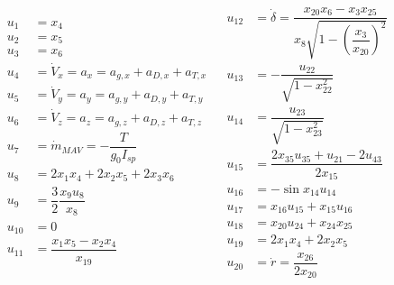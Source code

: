 \begin{align} \label{eq:unAuxEq1}
\begin{split} 
u_{1}&=x_{4}\\
u_{2}&=x_{5}\\
u_{3}&=x_{6} \\
u_{4}&=\dot{V}_{x}=a_{x}=a_{g,x}+a_{D,x}+a_{T,x}\\
u_{5}&=\dot{V}_{y}=a_{y}=a_{g,y}+a_{D,y}+a_{T,y}\\
u_{6}&=\dot{V}_{z}=a_{z}=a_{g,z}+a_{D,z}+a_{T,z}\\
u_{7} &=\dot{m}_{MAV}=-\dfrac{T}{g_{0}I_{sp}}\\
u_{8}&=2x_{1}x_{4}+2x_{2}x_{5}+2x_{3}x_{6}\\
u_{9}&=\dfrac{3}{2}\dfrac{x_{9}u_{8}}{x_{8}}\\
u_{10} &= 0 \\
u_{11} &= \dfrac{x_{1}x_{5}-x_{2}x_{4}}{x_{19}}\\
\end{split}
&
\begin{split}
u_{12} &= \dot{\delta} = \dfrac{x_{20}x_{6}-x_{3}x_{25}}{x_{8} \sqrt{1-\left(\dfrac{x_{3}}{x_{20}}\right)^{2}}}\\
u_{13} &= -\dfrac{u_{22}}{\sqrt{1-x_{22}^{2}}}\\
u_{14} &= \dfrac{u_{23}}{\sqrt{1-x_{23}^{2}}}\\
u_{15} &= \dfrac{2x_{35}u_{35}+u_{21}-2u_{43}}{2x_{15}} \\
u_{16} &= -\sin x_{14}u_{14}\\
u_{17} &= x_{16}u_{15}+x_{15}u_{16}\\
u_{18} &= x_{20}u_{24}+x_{24}x_{25}\\
u_{19} &= 2x_{1}x_{4}+2x_{2}x_{5}\\
u_{20} &= \dot{r} = \dfrac{x_{26}}{2 x_{20}}\\
\end{split}
\end{align}



